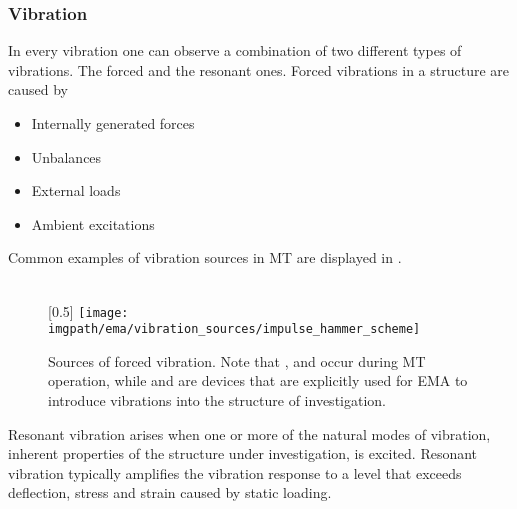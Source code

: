 \subsubsection{Vibration}

In every vibration one can observe a combination of two different types of vibrations. The forced and the resonant ones. Forced vibrations in a structure are caused by
\begin{itemize}
    \item Internally generated forces
    \item Unbalances
    \item External loads
    \item Ambient excitations
\end{itemize}
Common examples of vibration sources in \ac{MT} are displayed in .

\begin{figure}[!htb]
    \centering
        \hspace{4em}
    \hspace{4em}
    \\[5ex]
    \begingroup
    [0.5\linewidth]{%
        \texttt{[image: \\imgpath/ema/vibration\_sources/impulse\_hammer\_scheme]}}
    \endgroup
    \hspace{0em}
    \caption[Forced Vibration Sources]{Sources of forced vibration. Note that ,  and  occur during \ac{MT} operation, while  and  are devices that are explicitly used for \ac{EMA} to introduce vibrations into the structure of investigation.}
    \label{fig:vibration_sources}
\end{figure}

Resonant vibration arises when one or more of the natural modes of vibration, inherent properties of the structure under investigation, is excited. Resonant vibration typically amplifies the vibration response to a level that exceeds deflection, stress and strain caused by static loading. 

